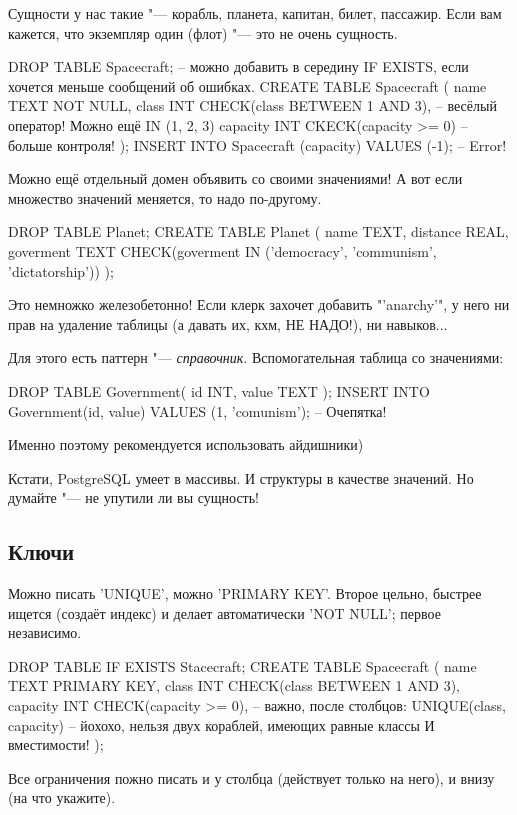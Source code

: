Сущности у нас такие "--- корабль, планета, капитан, билет, пассажир. Если вам кажется, что экземпляр один (флот) "--- это не очень сущность.
\begin{sqlcode}
DROP TABLE Spacecraft;
-- можно добавить в середину IF EXISTS, если хочется меньше сообщений об ошибках.
CREATE TABLE Spacecraft (
	name TEXT NOT NULL,
	class INT CHECK(class BETWEEN 1 AND 3), -- весёлый оператор! Можно ещё IN (1, 2, 3)
	capacity INT CKECK(capacity >= 0) -- больше контроля!
);
INSERT INTO Spacecraft (capacity) VALUES (-1); -- Error!
\end{sqlcode}
Можно ещё отдельный домен объявить со своими значениями!
А вот если множество значений меняется, то надо по-другому.
\begin{sqlcode}
DROP TABLE Planet; CREATE TABLE Planet (
	name TEXT,
	distance REAL,
	goverment TEXT CHECK(goverment IN ('democracy', 'communism', 'dictatorship'))
);
\end{sqlcode}
Это немножко железобетонно! Если клерк захочет добавить \sql"'anarchy'", у него ни прав на удаление таблицы (а давать их, кхм, НЕ НАДО!), 
ни навыков...

Для этого есть паттерн "--- \textit{справочник}.
Вспомогательная таблица со значениями:
\begin{sqlcode}
DROP TABLE Government(
	id INT,
	value TEXT
);
INSERT INTO Government(id, value) VALUES (1, 'comunism'); -- Очепятка!
\end{sqlcode}
Именно поэтому рекомендуется использовать айдишники)

Кстати, PostgreSQL умеет в массивы.
И структуры в качестве значений.
Но думайте "--- не упутили ли вы сущность!

\subsection{Ключи}

Можно писать \sql'UNIQUE', можно \sql'PRIMARY KEY'.
Второе цельно, быстрее ищется (создаёт индекс) и делает автоматически \sql'NOT NULL'; первое независимо.
\begin{sqlcode}
DROP TABLE IF EXISTS Stacecraft;
CREATE TABLE Spacecraft (
	name TEXT PRIMARY KEY,
	class INT CHECK(class BETWEEN 1 AND 3),
	capacity INT CHECK(capacity >= 0),
	-- важно, после столбцов:
	UNIQUE(class, capacity)
	-- йохохо, нельзя двух кораблей, имеющих равные классы И вместимости!
);
\end{sqlcode}
Все ограничения пожно писать и у столбца (действует только на него), и внизу (на что укажите).

